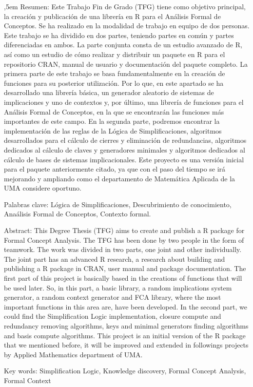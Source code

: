 \setcounter{page}{5}
{
,5em
Resumen: Este Trabajo Fin de Grado (TFG) tiene como objetivo principal, la creaci\'on y publicaci\'on de una librer\'ia 
en R para el An\'alisis Formal de Conceptos. Se ha realizado en la modalidad de trabajo en equipo de dos personas. 
Este trabajo se ha dividido en dos partes, teniendo partes en com\'un y partes diferenciadas en ambos. La parte conjunta 
consta de un estudio avanzado de R, as\'i como un estudio de c\'omo realizar y distribuir un paquete en R para el repositorio 
CRAN, manual de usuario y documentaci\'on del paquete completo. La primera parte de este trabajo se basa fundamentalmente en la creaci\'on de funciones para su posterior utilizaci\'on. Por lo que, 
en este apartado se ha desarrollado una librer\'ia b\'asica, un generador aleatorio de sistemas de implicaciones y uno de contextos y, 
por \'ultimo, una librer\'ia de funciones para el An\'alisis Formal de Conceptos, en la que se encontrar\'an las funciones m\'as importantes 
de este campo. En la segunda parte, podremos encontrar la implementaci\'on de las reglas de la L\'ogica de Simplificaciones, algoritmos desarrollados para el c\'alculo de cierres y eliminaci\'on de redundancias, algoritmos dedicados al c\'alculo de claves y generadores minimales y algoritmos dedicados al c\'alculo de bases de sistemas implicacionales. Este proyecto es una versi\'on inicial para el paquete anteriormente citado, ya que con el paso del tiempo se ir\'a mejorando y ampliando como el departamento de Matem\'atica Aplicada de la UMA considere oportuno.

\doublespacing

Palabras clave: L\'ogica de Simplificaciones, Descubrimiento de conocimiento,  Ana\'alisis Formal de Conceptos, Contexto formal. 

\bigskip

Abstract: This Degree Thesis (TFG) aims to create and publish a R package for Formal Concept Analysis. The TFG has been done by two people in the form of teamwork. The work was divided in two parts, one joint and other individually. The joint part has an advanced R research, a research about building and publishing a R package in CRAN, user manual and package documentation. The first part of this project is basically based in the creations of functions that will be used later. So, in this part, a basic library, a random implications system generator, a random context generator and FCA library, where the most important functions in this area are, have been developed. In the second part, we could find the Simplification Logic implementation, closure compute and redundancy removing algorithms, keys and minimal generators finding algorithms and basis compute algorithms. This project is an initial version of the R package that we mentioned before, it will be improved and extended in followings projects by Applied Mathematics department of UMA.

\doublespacing

Key words: Simplification Logic, Knowledge discovery, Formal Concept Analysis, Formal Context
}

\newpage

